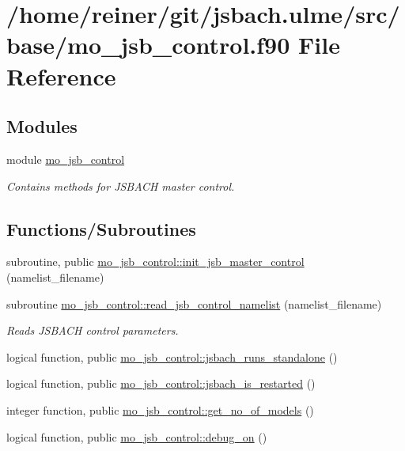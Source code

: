 \hypertarget{mo__jsb__control_8f90}{}\section{/home/reiner/git/jsbach.ulme/src/base/mo\+\_\+jsb\+\_\+control.f90 File Reference}
\label{mo__jsb__control_8f90}
\subsection*{Modules}
\begin{DoxyCompactItemize}
\item 
module \hyperlink{namespacemo__jsb__control}{mo\+\_\+jsb\+\_\+control}
\begin{DoxyCompactList}\small\item\em Contains methods for J\+S\+B\+A\+C\+H master control. \end{DoxyCompactList}\end{DoxyCompactItemize}
\subsection*{Functions/\+Subroutines}
\begin{DoxyCompactItemize}
\item 
subroutine, public \hyperlink{namespacemo__jsb__control_a6090e428421fd94a977d2962605f4b85}{mo\+\_\+jsb\+\_\+control\+::init\+\_\+jsb\+\_\+master\+\_\+control} (namelist\+\_\+filename)
\item 
subroutine \hyperlink{namespacemo__jsb__control_a7096485a9080a52ed242f5e352a810db}{mo\+\_\+jsb\+\_\+control\+::read\+\_\+jsb\+\_\+control\+\_\+namelist} (namelist\+\_\+filename)
\begin{DoxyCompactList}\small\item\em Reads J\+S\+B\+A\+C\+H control parameters. \end{DoxyCompactList}\item 
logical function, public \hyperlink{namespacemo__jsb__control_a6ca5c01f6a6fd0446629cad234309fe2}{mo\+\_\+jsb\+\_\+control\+::jsbach\+\_\+runs\+\_\+standalone} ()
\item 
logical function, public \hyperlink{namespacemo__jsb__control_a39662ac8e16fc4e50c7f42118f788dff}{mo\+\_\+jsb\+\_\+control\+::jsbach\+\_\+is\+\_\+restarted} ()
\item 
integer function, public \hyperlink{namespacemo__jsb__control_ad3ab17f12f0cd28d5d8007f04a8f0cf2}{mo\+\_\+jsb\+\_\+control\+::get\+\_\+no\+\_\+of\+\_\+models} ()
\item 
logical function, public \hyperlink{namespacemo__jsb__control_a5712e1cd2e5736d1d7e6a59707af0200}{mo\+\_\+jsb\+\_\+control\+::debug\+\_\+on} ()
\end{DoxyCompactItemize}
